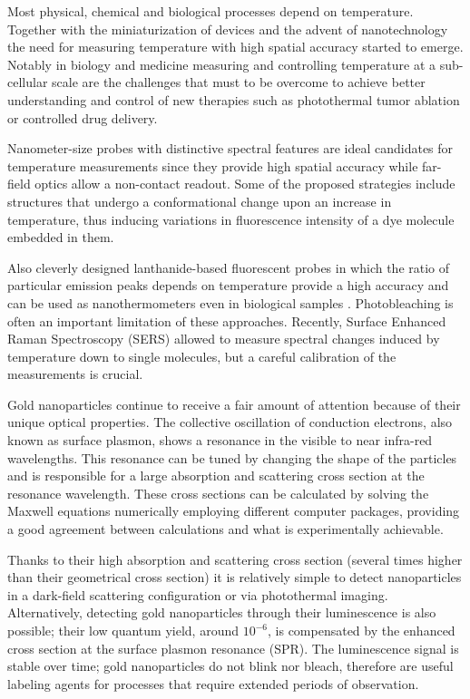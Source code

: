 \documentclass[journal=nalefd,manuscript=letter]{achemso}
\newcommand{\HI}[1]{{#1}} %
\begin{document}
Most physical, chemical and biological processes depend on
temperature. Together with the miniaturization of devices and the advent of
nanotechnology the need for measuring temperature with high spatial accuracy
started to emerge. Notably in biology\cite{Yang2011a,Hrelescu2010} and
medicine\cite{Li2013c} \HI{measuring and controlling temperature at a sub-cellular 
scale are the challenges that must to be overcome to achieve better understanding and control 
of new therapies such as photothermal tumor ablation\cite{Gobin2007} 
or controlled drug delivery\cite{Huang2006,Huo2014}.}

Nanometer-size probes with distinctive spectral features are ideal candidates
for temperature measurements since they provide high spatial accuracy while
far-field optics allow a non-contact readout. Some of the proposed strategies
include structures that undergo a conformational change upon an increase in
temperature\cite{Ebrahimi2014}, thus inducing variations in fluorescence
intensity of a dye molecule embedded in them.

Also cleverly designed lanthanide-based fluorescent probes in which the ratio of
particular emission peaks depends on temperature \HI{provide} a high accuracy and can
be used as nanothermometers \cite{liu2016ratiometric} even in biological samples
\cite{Vetrone2010}. Photobleaching is often an important limitation of these
approaches. Recently, Surface Enhanced Raman Spectroscopy (SERS) allowed to
measure spectral changes induced by temperature down to single
molecules\cite{Pozzi2015}, but a careful calibration of the measurements is
crucial.

Gold nanoparticles continue to receive a fair amount of attention because of
their unique optical properties\cite{Zijlstra2011}. The collective oscillation
of conduction electrons, also known as surface plasmon, shows a resonance in the visible to
near infra-red wavelengths. This resonance can be tuned by changing the shape of
the particles\cite{Carattino2016} and is responsible for a large absorption
and scattering cross section at the resonance wavelength. These cross sections can
be calculated by solving the Maxwell equations numerically employing different computer
packages\cite{Draine1994,Yurkin2011,Oskooi2010}, providing a good agreement
between calculations and what is experimentally achievable. 

Thanks to their high absorption and scattering cross section (several times higher
than their geometrical cross section) it is relatively simple to detect
nanoparticles in a dark-field scattering configuration\cite{Hu2008} or via
photothermal imaging\cite{boyer2002photothermal, Berciaud2006}.
Alternatively, detecting gold nanoparticles through their
luminescence\cite{Tcherniak2011} is also possible; their low quantum
yield\cite{Fang2012,Rao2015,Yorulmaz2012,Cheng2015}, \HI{around $10^{-6}$,}	
is compensated by the enhanced cross section at the surface plasmon resonance
(SPR). The luminescence signal is stable over time; gold nanoparticles do not
blink nor bleach, therefore are useful labeling agents for processes that
require extended periods of observation\cite{Wang2005}.
\end{document}
